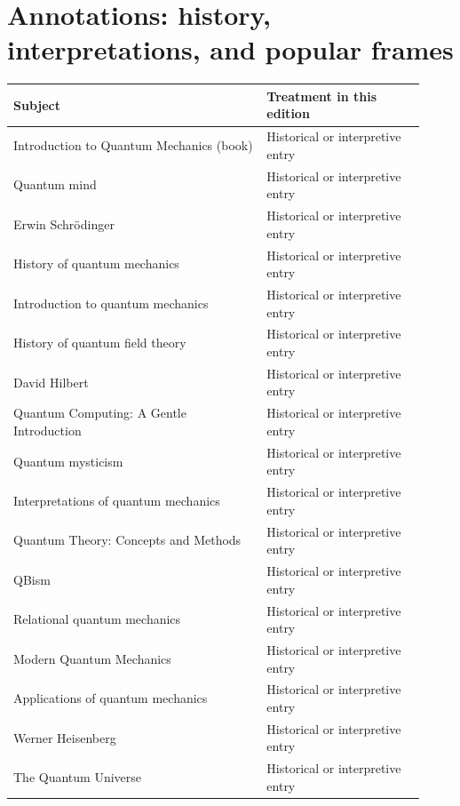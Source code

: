 \documentclass[11pt,oneside]{book}
\begin{document}
\section*{Annotations: history, interpretations, and popular frames}
\begin{longtable}{p{0.57\linewidth}p{0.35\linewidth}}
\toprule Subject & Treatment in this edition \\
\midrule\endhead
{}\label{index:introduction-to-quantum-mechanics-book}Introduction to Quantum Mechanics (book) & Historical or interpretive entry \\
\label{index:quantum-mind}Quantum mind & Historical or interpretive entry \\
\label{index:erwin-schr-dinger}Erwin Schrödinger & Historical or interpretive entry \\
\label{index:history-of-quantum-mechanics}History of quantum mechanics & Historical or interpretive entry \\
\label{index:introduction-to-quantum-mechanics}Introduction to quantum mechanics & Historical or interpretive entry \\
\label{index:history-of-quantum-field-theory}History of quantum field theory & Historical or interpretive entry \\
\label{index:david-hilbert}David Hilbert & Historical or interpretive entry \\
\label{index:quantum-computing-a-gentle-introduction}Quantum Computing: A Gentle Introduction & Historical or interpretive entry \\
\label{index:quantum-mysticism}Quantum mysticism & Historical or interpretive entry \\
\label{index:interpretations-of-quantum-mechanics}Interpretations of quantum mechanics & Historical or interpretive entry \\
\label{index:quantum-theory-concepts-and-methods}Quantum Theory: Concepts and Methods & Historical or interpretive entry \\
\label{index:qbism}QBism & Historical or interpretive entry \\
\label{index:relational-quantum-mechanics}Relational quantum mechanics & Historical or interpretive entry \\
\label{index:modern-quantum-mechanics}Modern Quantum Mechanics & Historical or interpretive entry \\
\label{index:applications-of-quantum-mechanics}Applications of quantum mechanics & Historical or interpretive entry \\
\label{index:werner-heisenberg}Werner Heisenberg & Historical or interpretive entry \\
\label{index:the-quantum-universe}The Quantum Universe & Historical or interpretive entry \\
\bottomrule
\end{longtable}
\end{document}
